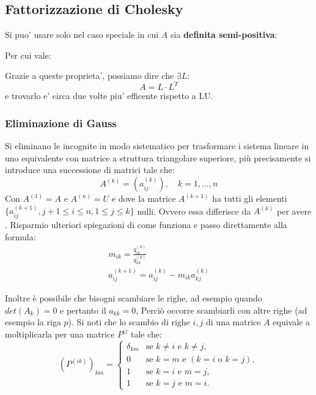 \subsection{Fattorizzazione di Cholesky}
Si puo' usare solo nel caso speciale in cui $ A $ sia \textbf{definita semi-positiva}:

Per cui vale:

Grazie a queste proprieta', possiamo dire che $ \exists L: $
\[
A = L \cdot L^T
\]
e trovarlo e' circa due volte piu' efficente rispetto a LU.



\subsubsection{Eliminazione di Gauss}

Si eliminano le incognite in modo sistematico per trasformare i sistema lineare in uno equivalente con matrice a struttura triangolare superiore, più precisamente si introduce una successione di matrici tale che:
\[
            A^{(k)} = (a_{ij}^{(k)}), \quad k = 1,\dots,n
\]
Con $A^{(1)} = A$ e $A^{(n)} = U$ e dove la matrice $A^{(k+1)}$ ha tutti gli elementi $\{a_{ij}^{(k+1)}, j+1 \leq i\leq n, 1\leq j \leq k\}$ nulli. Ovvero essa differisce da $A^{(k)}$ per avere . Risparmio ulteriori spiegazioni di come funziona e passo direttamente alla formula:
\[
    \begin{array}{l}
        m_{ik} = \frac{q_{ik} ^ {(k)}}{q_{kk} ^ {(k)}} \\
        a_{ij}^{(k+1)} = a_{ij}^{(k)} - m_{ik} a_{kj} ^ {(k)}
    \end{array}
\]

Inoltre è possibile che bisogni scambiare le righe, ad esempio quando $det(A_k) = 0$ e pertanto il $a_{kk} = 0$, Perciò occorre scambiarli con altre righe (ad esempio la riga $p$). Si noti che lo scambio di righe $i,j$ di una matrice $A$ equivale a moltiplicarla per una matrice $P^{ij}$ tale che:
\[
    (P^{(ik)})_{km} =
        \begin{cases} 
            \delta_{km} & \text{se } k \neq i \text{ e } k \neq j, \\ 
            0 & \text{se } k = m \text{ e } (k = i \text{ o } k = j), \\ 
            1 & \text{se } k = i \text{ e } m = j, \\ 
            1 & \text{se } k = j \text{ e } m = i.
        \end{cases}
\]


